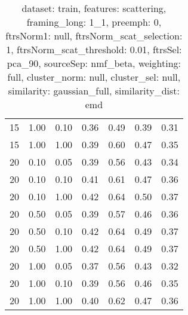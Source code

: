 \begin{table}
\begin{center}
\begin{tabular}{lllcccc}
15 & 1.00 & 0.10 & 0.36 & 0.49 & 0.39 & 0.31 \\ 
15 & 1.00 & 1.00 & 0.39 & 0.60 & 0.47 & 0.35 \\ 
20 & 0.10 & 0.05 & 0.39 & 0.56 & 0.43 & 0.34 \\ 
20 & 0.10 & 0.10 & 0.41 & 0.61 & 0.47 & 0.36 \\ 
20 & 0.10 & 1.00 & 0.42 & 0.64 & 0.50 & 0.37 \\ 
20 & 0.50 & 0.05 & 0.39 & 0.57 & 0.46 & 0.36 \\ 
20 & 0.50 & 0.10 & 0.42 & 0.64 & 0.49 & 0.37 \\ 
20 & 0.50 & 1.00 & 0.42 & 0.64 & 0.49 & 0.37 \\ 
20 & 1.00 & 0.05 & 0.37 & 0.56 & 0.43 & 0.32 \\ 
20 & 1.00 & 0.10 & 0.39 & 0.56 & 0.46 & 0.35 \\ 
20 & 1.00 & 1.00 & 0.40 & 0.62 & 0.47 & 0.36 \\ 
\end{tabular} 
\end{center} 
\caption{dataset: train, features: scattering, framing\_long: 1\_1, preemph: 0, ftrsNorm1: null, ftrsNorm\_scat\_selection: 1, ftrsNorm\_scat\_threshold: 0.01, ftrsSel: pca\_90, sourceSep: nmf\_beta, weighting: full, cluster\_norm: null, cluster\_sel: null, similarity: gaussian\_full, similarity\_dist: emd} 
\label{datasetrFeaturscFraminlong1_1Preemp0Ftrsnorm1nuFtrsnoscatselect1Ftrsnoscatthresh0.01Ftrsselpc90SourcesepnmbeWeightfuClustenormnuClusteselnuSimilagafuSimiladistem} 
\end{table} 
 

